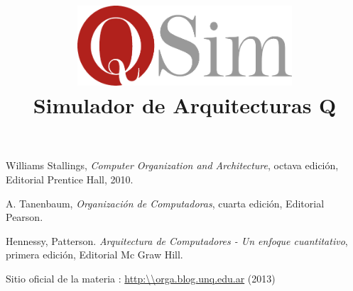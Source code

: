 \documentclass[11pt,a4paper]{book}
\author{\susi \and \tati}
\title{\includegraphics[width=8cm]{logo}\\Simulador de Arquitecturas Q}
\begin{document}
\maketitle


\tableofcontents

\newpage




\appendix




\newpage
\begin{thebibliography}{9}

 Williams Stallings, \emph{Computer Organization and Architecture}, octava edición, Editorial Prentice Hall, 2010.

 A. Tanenbaum, \emph{Organización de Computadoras}, cuarta edición, Editorial Pearson.

 Hennessy, Patterson. \emph{Arquitectura de Computadores - Un enfoque cuantitativo}, primera edición,  Editorial Mc Graw Hill.

 Sitio oficial de la materia \orga: \url{http:\\orga.blog.unq.edu.ar} (2013)

\end{thebibliography}
\end{document}
